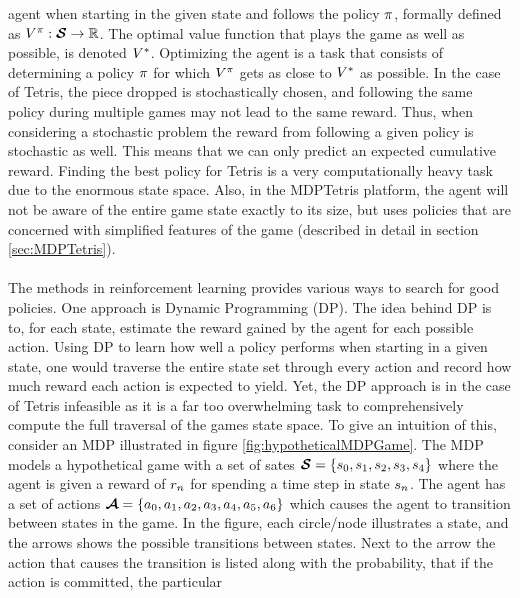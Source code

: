 agent when starting in the given state and follows
the policy $\pi$, formally defined as
$V^{\pi} : \boldsymbol{\mathcal{S}} \rightarrow \mathbb{R}$. 
The optimal value function that plays the game as well
as possible, is denoted $V^{*}$. Optimizing the 
agent is a task that consists of determining a policy $\pi$ for which
$V^{\pi}$ gets as close to $V^{*}$
as possible. In the case of Tetris, the piece dropped is stochastically 
chosen, and following the same policy during multiple games may not lead to the 
same reward. Thus, when considering a stochastic problem the reward 
from following a given policy is stochastic as well. This means that 
we can only predict an expected cumulative reward.
Finding the best policy for Tetris is a very computationally heavy 
task due to the enormous state space. Also, in the MDPTetris platform,
the agent will not be aware of the entire game state exactly to its 
size, but uses policies that are concerned with simplified
features of the game (described in detail in section \ref{sec:MDPTetris}).\\
\\
The methods in reinforcement learning provides various ways to
search for good policies.
One approach is 
Dynamic Programming (DP). The idea behind DP is to, for each state,
estimate the reward gained by the agent for each possible action.
Using DP to learn how well a policy performs when starting in a 
given state, one would traverse the entire state set through every
action and record how much reward each action is expected to 
yield.
Yet, the DP approach is in the case of Tetris infeasible as it 
is a far too overwhelming task to comprehensively compute
the full traversal of the games state space. 
To give an intuition of this, consider
an MDP illustrated in figure \ref{fig:hypotheticalMDPGame}.
The MDP models a hypothetical game with a set of sates 
$\boldsymbol{\mathcal{S}} = \{s_0, s_1, s_2, s_3,
s_4\}$ where the agent is given a reward of $r_n$
for spending a time step in state $s_n$. The agent has a 
set of actions $\boldsymbol{\mathcal{A}} = \{a_0, a_1, 
a_2, a_3, a_4, 
a_5, a_6\}$ which causes the agent to transition 
between states in the game. In the figure, each circle/node illustrates a 
state, and the arrows shows the possible transitions between states.
Next to the arrow the action that causes the transition is listed 
along with the probability, that if the action is committed, the particular 
